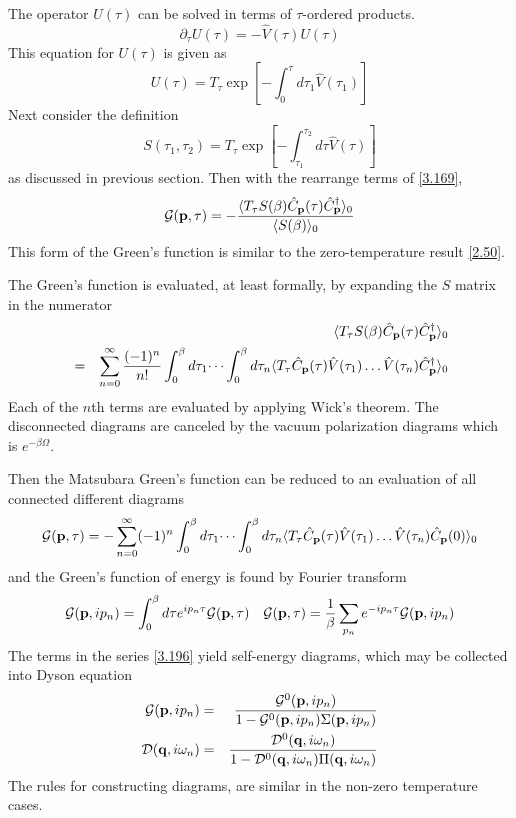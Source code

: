 The operator $U(\tau)$ can be solved in terms of $\tau$-ordered products.
\begin{equation}
  \partial_\tau U(\tau) = -\hat{V}(\tau) U(\tau)  \label{3.173}
\end{equation}
This equation for $U(\tau)$ is given as
\begin{equation}
  U(\tau) = T_\tau \exp\left[- \int_0^\tau d\tau_1 \hat{V}(\tau_1) \right]  \label{3.177}
\end{equation}
Next consider the definition
\begin{equation}
  S(\tau_1,\tau_2) = T_\tau \exp\left[ -\int_{\tau_1}^{\tau_2} d\tau \hat{V}(\tau) \right] \label{3.178}
\end{equation}
as discussed in previous section.
Then with the rearrange terms of \eqref{3.169},
\begin{equation}
  \mathcal{G} (\mathbf{p},\tau) = - \frac{\langle T_\tau S(\beta) \hat{C}_{\mathbf{p}}(\tau) \hat{C}^\dagger_{\mathbf{p}} \rangle_0}{\langle S(\beta) \rangle_0} \label{3.185}
\end{equation}
This form of the Green's function is similar to the zero-temperature result \eqref{2.50}.

The Green's function is evaluated, at least formally, by expanding the $S$ matrix in the numerator
\begin{eqnarray}
  &&\langle T_\tau S(\beta) \hat{C}_{\mathbf{p}} (\tau) \hat{C}^\dagger_{\mathbf{p}} \rangle_0  \label{3.186}\\
  &=& \sum_{n=0}^\infty \frac{(-1)^n}{n!} \int_0^\beta d\tau_1 \dots \int_0^\beta d\tau_n  \langle T_\tau \hat{C}_{\mathbf{p}}(\tau) \hat{V}(\tau_1) \dots \hat{V}(\tau_n) \hat{C}^\dagger_{\mathbf{p}} \rangle_0 \nonumber
\end{eqnarray}
Each of the $n$th terms are evaluated by applying Wick's theorem.
The disconnected diagrams are canceled by the vacuum polarization diagrams which is $e^{-\beta \Omega}$.

Then the Matsubara Green's function can be reduced to an evaluation of all connected different diagrams
\begin{equation}
  \mathcal{G}(\mathbf{p},\tau) = - \sum_{n=0}^\infty (-1)^n \int_0^\beta d\tau_1 \dots \int_0^\beta d\tau_n \langle T_\tau \hat{C}_{\mathbf{p}}(\tau)\hat{V}(\tau_1)\dots\hat{V}(\tau_n)\hat{C}_{\mathbf{p}}(0) \rangle_0 \label{3.196}
\end{equation}
and the Green's function of energy is found by Fourier transform
\begin{equation}
  \mathcal{G}(\mathbf{p},ip_n) = \int_0^\beta d\tau e^{ip_n\tau}\mathcal{G}(\mathbf{p},\tau) ~ ~ ~ \mathcal{G}(\mathbf{p},\tau) = \frac{1}{\beta} \sum_{p_n} e^{-ip_n\tau} \mathcal{G}(\mathbf{p},ip_n)  \label{3.197}
\end{equation}
The terms in the series \eqref{3.196} yield self-energy diagrams, which may be collected into Dyson equation
\begin{eqnarray}
  \mathcal{G}(\mathbf{p},ip_n) &=& \frac{\mathcal{G}^0(\mathbf{p},ip_n)}{1 - \mathcal{G}^0(\mathbf{p},ip_n) \Sigma(\mathbf{p},ip_n)} \label{3.198} \\
  \mathcal{D} (\mathbf{q},i\omega_n) &=& \frac{\mathcal{D}^0(\mathbf{q},i\omega_n)}{1-\mathcal{D}^0(\mathbf{q},i\omega_n) \Pi(\mathbf{q},i\omega_n)} \label{3.199}
\end{eqnarray}
The rules for constructing diagrams, are similar in the non-zero temperature cases.

